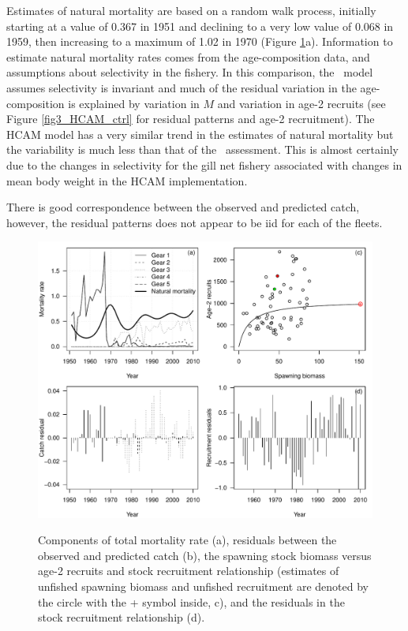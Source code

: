 Estimates of natural mortality are based on a random walk process, initially starting at a value of 0.367 in 1951 and declining to a very low value of 0.068 in 1959, then increasing to a maximum of 1.02 in 1970 (Figure \ref{fig2_HCAM_ctrl}a).  Information to estimate natural mortality rates comes from the age-composition data, and assumptions about selectivity in the fishery.  In this comparison, the \iscam\ model assumes selectivity is invariant and much of the residual variation in the age-composition is explained by variation in $M$ and variation in age-2 recruits (see Figure \ref{fig3_HCAM_ctrl} for residual patterns and age-2 recruitment).  The HCAM model has a very similar trend in the estimates of natural mortality but the variability is much less than that of the \iscam\ assessment.  This is almost certainly due to the changes in selectivity for the gill net fishery associated with changes in mean body weight in the HCAM implementation.

There is good correspondence between the observed and predicted catch, however, the residual patterns does not appear to be iid for each of the fleets.  

 

\begin{figure}[!tbp]
	\includegraphics[width=\textwidth]{Figs/fig2_HCAM_ctrl.pdf}\\
	\caption{Components of total mortality rate (a), residuals between the observed and predicted catch (b), the spawning stock biomass versus age-2 recruits and stock recruitment relationship (estimates of unfished spawning biomass and unfished recruitment are denoted by the circle with the + symbol inside, c), and the residuals in the stock recruitment relationship (d). }\label{fig2_HCAM_ctrl}
\end{figure}

